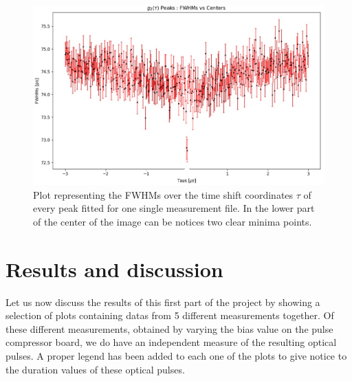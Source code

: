 \begin{figure}[hbtp]
\centering
\includegraphics[width=1\textwidth]{FWHMvsTAU_Single.jpg}
\caption{Plot representing the FWHMs over the time shift coordinates $\tau$ of every peak fitted for one single measurement file. In the lower part of the center of the image can be notices two clear minima points.}
\label{FWHMvsTauSingle}
\end{figure}


\section{Results and discussion}
\label{EOMresults}
Let us now discuss the results of this first part of the project by showing a selection of plots containing datas from 5 different measurements together.
Of these different measurements, obtained by varying the bias value on the pulse compressor board, we do have an independent measure of the resulting optical pulses. A proper legend has been added to each one of the plots to give notice to the duration values of these optical pulses.

